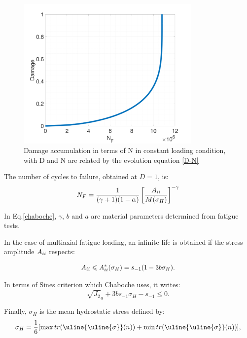 \begin{figure}[!h]
	\centering
	\includegraphics[width=0.8\textwidth]{figures//D-N.png} 
	\caption{Damage accumulation in terms of N in constant loading condition, with D and N are related by the evolution equation \eqref{D-N}}
	\label{DN}
\end{figure}

The number of cycles to failure, obtained at $D=1$, is: 
\begin{equation}N_F = \frac{1}{(\gamma+1)(1-\alpha)}\left[\frac{A_{\uppercase\expandafter{\romannumeral2}}}{M(\sigma_H)}\right]^{-\gamma}
\label{chaboche}
\end{equation} 

In Eq.\eqref{chaboche}, $\gamma$, $b$ and $a$ are material parameters determined from fatigue tests.

In the case of multiaxial fatigue loading, an infinite life is obtained if the stress amplitude $A_{\uppercase\expandafter{\romannumeral2}}$ respects:

\begin{equation}A_{\uppercase\expandafter{\romannumeral2}}\leqslant A_{\uppercase\expandafter{\romannumeral2}}^\ast(\sigma_H)=s_{-1}(1-3b\sigma_H).\end{equation}

In terms of Sines criterion which Chaboche uses, it writes:
\begin{equation}\sqrt{J_2}_a+3bs_{-1}\sigma_H-s_{-1}\leqslant 0.
\label{sines}
\end{equation}

Finally, $\sigma_H$ is the mean hydrostatic stress defined by:
\begin{equation}\sigma_H=\frac{1}{6}[\max tr(\uline{\uline{\sigma}}(n))+\min tr(\uline{\uline{\sigma}}(n))],\end{equation}


